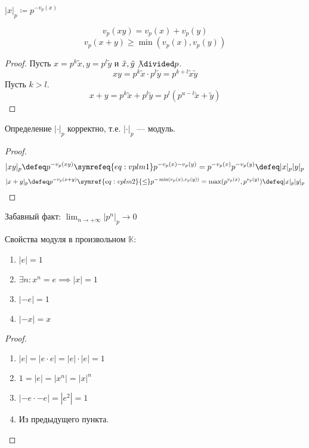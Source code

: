 \begin{definition}[\(p\)-модуль]
	\(|x|_p \coloneqq p^{-v_p(x)}\)
\end{definition}

\begin{lemma}
	\begin{equation}
		v_p(xy) = v_p(x) + v_p(y) \label{eq:vplm1}
	\end{equation}
	\begin{equation}
		v_p(x + y) \ge \min(v_p(x), v_p(y)) \label{eq:vplm2}
	\end{equation}\[\]
\end{lemma}
\begin{proof}
	Пусть \(x = p^k \tilde{x}, y = p^l \tilde{y}\) и \(\tilde{x}, \tilde{y} \not\divided p\).
	\[xy = p^k \tilde{x} \cdot p^l \tilde{y} = p^{k + l} \tilde{x} \tilde{y}\]
	Пусть \(k > l\).
	\[x + y = p^k \tilde{x} + p^l \tilde{y} = p^l(p^{u - l} \tilde{x} + \tilde{y})\]
\end{proof}

\begin{lemma}
	Определение \(|\cdot|_p\) корректно, т.е. \(|\cdot|_p\) --- модуль.
\end{lemma}
\begin{proof}
	\[|xy|_p \defeq p^{-v_p(xy)} \symrefeq{eq:vplm1} p^{-v_p(x) -v_p(y)} = p^{-v_p(x)} p^{-v_p(y)} \defeq |x|_p |y|_p\]
	\[|x + y|_p \defeq p^{-v_p(x + y)} \symref{eq:vplm2}{\le} p^{-\min(v_p(x), v_p(y))}
		= \max(p^{v_p(x)}, p^{v_p(y)}) \defeq |x|_p |y|_p\]
\end{proof}

Забавный факт: \(\lim_{n \to +\infty} |p^n|_p \to 0\)

\begin{lemma}
	Свойства модуля в произвольном \(\mathbb{K}\):
	\begin{enumerate}
		\item \(|e| = 1\)
		\item \(\exists n : x^n = e \implies |x| = 1\)
		\item \(|-e| = 1\)
		\item \(|-x| = x\)
	\end{enumerate}
\end{lemma}
\begin{proof}\itemfix
	\begin{enumerate}
		\item \(|e| = |e \cdot e| = |e| \cdot |e| = 1\)
		\item \(1 = |e| = |x^n| = |x|^n\)
		\item \(|-e \cdot -e| = |e^2| = 1\)
		\item Из предыдущего пункта.
	\end{enumerate}
\end{proof}

